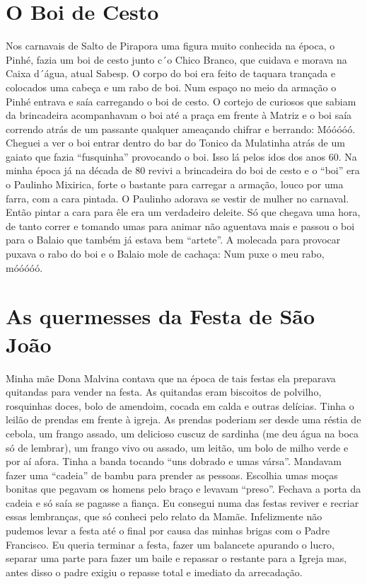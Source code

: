 \documentclass[12pt,brazil,]{book}
\begin{document}
\section{O Boi de Cesto}\label{o-boi-de-cesto}

Nos carnavais de Salto de Pirapora uma figura muito conhecida na época,
o Pinhé, fazia um boi de cesto junto c´o Chico Branco, que cuidava e
morava na Caixa d´água, atual Sabesp. O corpo do boi era feito de
taquara trançada e colocados uma cabeça e um rabo de boi. Num espaço no
meio da armação o Pinhé entrava e saía carregando o boi de cesto. O
cortejo de curiosos que sabiam da brincadeira acompanhavam o boi até a
praça em frente à Matriz e o boi saía correndo atrás de um passante
qualquer ameaçando chifrar e berrando: Móóóóó. Cheguei a ver o boi
entrar dentro do bar do Tonico da Mulatinha atrás de um gaiato que fazia
``fusquinha'' provocando o boi. Isso lá pelos idos dos anos 60. Na minha
época já na década de 80 revivi a brincadeira do boi de cesto e o
``boi'' era o Paulinho Mixirica, forte o bastante para carregar a
armação, louco por uma farra, com a cara pintada. O Paulinho adorava se
vestir de mulher no carnaval. Então pintar a cara para êle era um
verdadeiro deleite. Só que chegava uma hora, de tanto correr e tomando
umas para animar não aguentava mais e passou o boi para o Balaio que
também já estava bem ``artete''. A molecada para provocar puxava o rabo
do boi e o Balaio mole de cachaça: Num puxe o meu rabo, móóóóó.

\section{As quermesses da Festa de São
João}\label{as-quermesses-da-festa-de-suxe3o-jouxe3o}

Minha mãe Dona Malvina contava que na época de tais festas ela preparava
quitandas para vender na festa. As quitandas eram biscoitos de polvilho,
rosquinhas doces, bolo de amendoim, cocada em calda e outras delícias.
Tinha o leilão de prendas em frente à igreja. As prendas poderiam ser
desde uma réstia de cebola, um frango assado, um delicioso cuscuz de
sardinha (me deu água na boca só de lembrar), um frango vivo ou assado,
um leitão, um bolo de milho verde e por aí afora. Tinha a banda tocando
``uns dobrado e umas vársa''. Mandavam fazer uma ``cadeia'' de bambu
para prender as pessoas. Escolhia umas moças bonitas que pegavam os
homens pelo braço e levavam ``preso''. Fechava a porta da cadeia e só
saía se pagasse a fiança. Eu consegui numa das festas reviver e recriar
essas lembranças, que só conheci pelo relato da Mamãe. Infelizmente não
pudemos levar a festa até o final por causa das minhas brigas com o
Padre Francisco. Eu queria terminar a festa, fazer um balancete apurando
o lucro, separar uma parte para fazer um baile e repassar o restante
para a Igreja mas, antes disso o padre exigiu o repasse total e imediato
da arrecadação.
\end{document}
